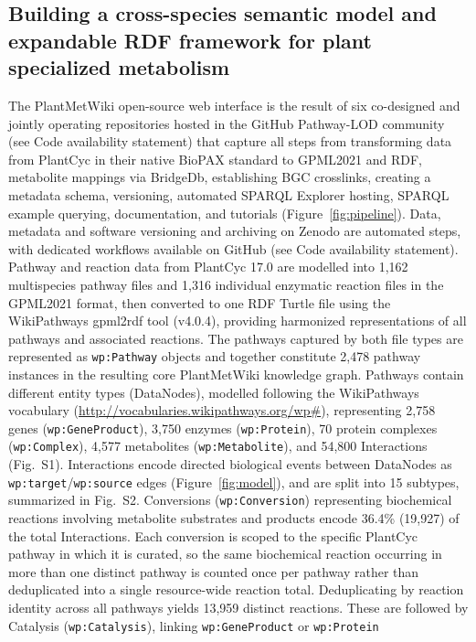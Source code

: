 \documentclass[11pt,a4paper]{article}
\begin{document}
\subsection*{Building a cross-species semantic model and expandable RDF framework for plant specialized metabolism}

The PlantMetWiki open-source web interface is the result of six co-designed and jointly operating
repositories hosted in the GitHub Pathway-LOD community (see Code availability statement) that
capture all steps from transforming data from PlantCyc in their native BioPAX standard to GPML2021
and RDF, metabolite mappings via BridgeDb, establishing BGC crosslinks, creating a metadata schema,
versioning, automated SPARQL Explorer hosting, SPARQL example querying, documentation, and tutorials
(Figure~\ref{fig:pipeline}). Data, metadata and software versioning and archiving on Zenodo are
automated steps, with dedicated workflows available on GitHub (see Code availability statement).
Pathway and reaction data from PlantCyc 17.0 are modelled into 1,162 multispecies pathway files and
1,316 individual enzymatic reaction files in the GPML2021 format, then converted to one RDF Turtle
file using the WikiPathways gpml2rdf tool (v4.0.4), providing harmonized representations of all
pathways and associated reactions. The pathways captured by both file types are represented as
\texttt{wp:Pathway} objects and together constitute 2,478 pathway instances in the resulting core
PlantMetWiki knowledge graph. Pathways contain different entity types (DataNodes), modelled following
the WikiPathways vocabulary (\url{http://vocabularies.wikipathways.org/wp#}), representing 2,758
genes (\texttt{wp:GeneProduct}), 3,750 enzymes (\texttt{wp:Protein}), 70 protein complexes
(\texttt{wp:Complex}), 4,577 metabolites (\texttt{wp:Metabolite}), and 54,800 Interactions
(Fig.~S1). Interactions encode directed biological events between DataNodes as
\texttt{wp:target}/\texttt{wp:source} edges (Figure~\ref{fig:model}), and are split into 15 subtypes,
summarized in Fig.~S2. Conversions (\texttt{wp:Conversion}) representing biochemical reactions
involving metabolite substrates and products encode 36.4\% (19,927) of the total Interactions.
Each conversion is scoped to the specific PlantCyc pathway in which it is curated, so
the same biochemical reaction occurring in more than one distinct pathway is counted once per pathway
rather than deduplicated into a single resource-wide reaction total. Deduplicating by reaction identity
across all pathways yields 13,959 distinct reactions.
These are followed by Catalysis (\texttt{wp:Catalysis}), linking \texttt{wp:GeneProduct} or \texttt{wp:Protein}
\end{document}
